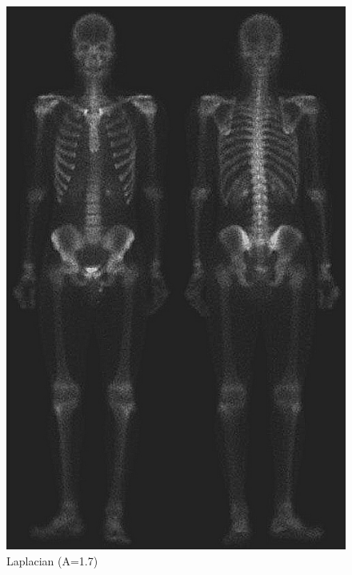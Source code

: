     \begin{figure}[!htb]\centering
        \includegraphics[width=0.4\linewidth]{./images/2/laplacian_A1-7.jpg}
        \caption{Laplacian (A=1.7)}\label{diagram:laplacian_1_7}
    \end{figure}

